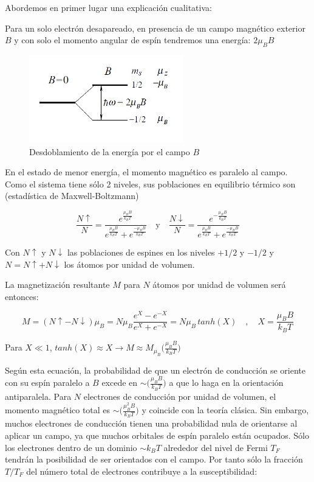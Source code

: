 Abordemos en primer lugar una explicación cualitativa:

Para un solo electrón desapareado, en presencia de un campo magnético exterior $B$ y con solo el momento angular de espín tendremos una energía: $2\mu_{B}B$

\begin{figure}[H]
    \centering
    \includegraphics[width=0.6\textwidth]{./Figures/dosNiveles}
	\caption{Desdoblamiento de la energía por el campo $B$}
	\label{fig:dosNiveles}
\end{figure}

En el estado de menor energía, el momento magnético es paralelo al campo. Como el sistema tiene sólo 2 niveles, sus poblaciones en equilibrio térmico son (estadística de Maxwell-Boltzmann)

\begin{equation}
\frac{N\uparrow}{N}=\frac{e^{\frac{\mu_{B}B}{k_{B}T}}}{e^{\frac{\mu_{B}B}{k_{B}T}}+e^{\frac{-\mu_{B}B}{k_{B}T}}} \quad \text{y} \quad \frac{N\downarrow}{N}=\frac{e^{-\frac{\mu_{B}B}{k_{B}T}}}{e^{\frac{\mu_{B}B}{k_{B}T}}+e^{\frac{-\mu_{B}B}{k_{B}T}}}
\end{equation}

Con $N\uparrow$ y $N\downarrow$ las poblaciones de espines en los niveles $+1/2$ y $-1/2$ y $N=N\uparrow+N\downarrow$ los átomos por unidad de volumen.

La magnetización resultante $M$ para $N$ átomos por unidad de volumen será entonces:

\begin{equation}
M=(N\uparrow-N\downarrow)\mu_{B}=N\mu_{B}\frac{e^{X}-e^{-X}}{e^{X}+e^{-X}}=N\mu_{B}\,tanh(X) \quad,\quad  X=\frac{\mu_{B}B}{k_{B}T}
\end{equation}

Para $X\ll1$, $tanh(X)\approx X \longrightarrow M\approx M_{\mu_{B}}\big(\frac{\mu_{B}B}{k_{B}T}\big)$

Según esta ecuación, la probabilidad de que un electrón de conducción se oriente con su espín paralelo a $B$ excede en $\sim\big(\frac{\mu_{B}B}{k_{B}T}\big)$ a que lo haga en la orientación antiparalela. Para $N$ electrones de conducción por unidad de volumen, el momento magnético total es $\sim \big( \frac{\mu_{B}^{2}B}{k_{B}T}\big)$ y coincide con la teoría clásica. Sin embargo, muchos electrones de conducción tienen una probabilidad nula de orientarse al aplicar un campo, ya que muchos orbitales de espín paralelo están ocupados. Sólo los electrones dentro de un dominio $\sim k_{B} T$ alrededor del nivel de Fermi $T_{F}$ tendrán la posibilidad de ser orientados con el campo. Por tanto sólo la fracción $T/T_{F}$ del número total de electrones contribuye a la susceptibilidad:

